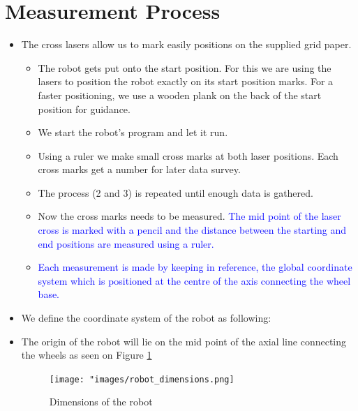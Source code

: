     \section{Measurement Process}
        \begin{itemize}
            \item The cross lasers allow us to mark easily positions on the supplied grid paper.
            
            \begin{itemize}
                \item [1.]	
            The robot gets put onto the start position. For this we are using the lasers to position the robot exactly on its start position marks. For a faster positioning, we use a wooden plank on the back of the start position for guidance. 
            \item [2.] We start the robot's program and let it run.
            \item [3.] Using a ruler we make small cross marks at both laser positions. Each cross marks get a number for later data survey.
            \item [4.] The process (2 and 3) is repeated until enough data is gathered.
            \item [5.] Now the cross marks needs to be measured. \textcolor{blue}{The mid point of the laser cross is marked with a pencil and the distance between the starting and end positions are measured using  a ruler.}
            \item[6.] \textcolor{blue}{Each measurement is made by keeping in reference, the global coordinate system which is positioned at the centre of the axis connecting the wheel base.}
            \end{itemize}
            
            \item  We define the coordinate system of the robot as following: 
            \item The origin of the robot will lie on the mid point of the axial line connecting the wheels as seen on Figure \ref{fig:Dimensions of the robot} 
            
            \begin{figure}[!ht] 
                        \centering \texttt{[image: "images/robot\_dimensions.png]}
                        \caption{Dimensions of the robot}
                        \label{fig:Dimensions of the robot}
                 \end{figure}
            

\end{itemize}
